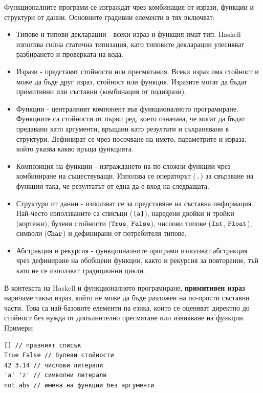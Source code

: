 \documentclass{article}
\newcommand{\cppplain}[1]{\textcolor{black}{\texttt{#1}}}
\begin{document}
Функционалните програми се изграждат чрез комбинация от изрази, функции и структури от данни. Основните градивни елементи в тях включват:
\begin{itemize}
    \item Типове и типови декларации - всеки израз и функция имат тип. Haskell използва силна статична типизация, като типовите декларации улесняват
    разбирането и проверката на кода.
    \item Изрази - представят стойности или пресмятания. Всеки израз има стойност и може да бъде друг израз, стойност или функция.
    Изразите могат да бъдат примитивни или съставни (комбинация от подизрази).
    \item Функции - централният компонент във функционалното програмиране. Функциите са стойности от първи ред, което означава, че могат да бъдат
    предавани като аргументи, връщани като резултати и съхранявани в структури. Дефинират се чрез посочване на името, параметрите и израза, който
    указва какво връща функцията.
    \item Композиция на функции - изграждането на по-сложни функции чрез комбиниране на съществуващи. Използва се операторът ($\cppplain{.}$) за свързване на функции
    така, че резултатът от една да е вход на следващата.
    \item Структури от данни - използват се за представяне на съставна информация. Най-често използваните са списъци ($\cppplain{[a]}$), наредени двойки и тройки
    (кортежи), булеви стойности ($\cppplain{True}$, $\cppplain{False}$), числови типове ($\cppplain{Int}$, $\cppplain{Float}$), символи ($\cppplain{Char}$) и дефинирани от
    потребителя типове.
    \item Абстракция и рекурсия - функционалните програми използват абстракция чрез дефиниране на обобщени функции, както и рекурсия за повторение, тъй
    като не се използват традиционни цикли.
\end{itemize}
В контекста на Haskell и функционалното програмиране, \textbf{примитивен израз} наричаме такъв израз, който не може да бъде разложен на по-прости съставни части.
Това са най-базовите елементи на езика, които се оценяват директно до стойност без нужда от допълнително пресмятане или извикване на функции. \newline\newline
Примери:
\begin{lstlisting}[style=cpp]
[] // празният списък
True False // булеви стойности
42 3.14 // числови литерали
'a' 'z' // символни литерали
not abs // имена на функции без аргументи
\end{lstlisting}
\end{document}
